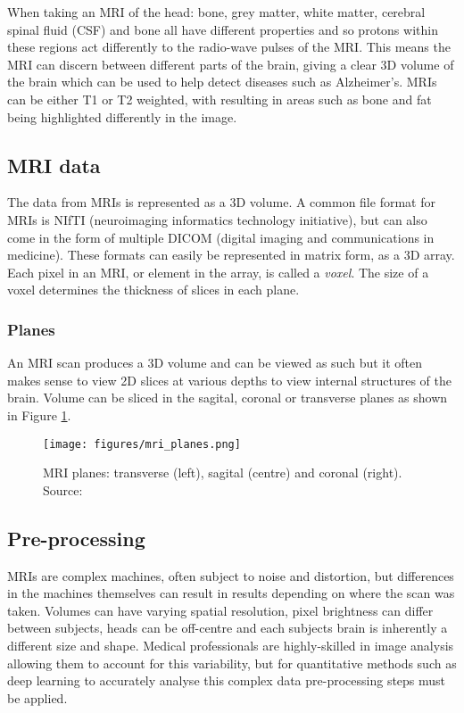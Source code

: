 \documentclass[
    author={Kai Hulme},
    supervisor={Dr Jon Bird},
    degree={BSc},
    title={Generative Adversarial Networks as an Augmentation Technique},
    subtitle={for Alzheimer's Disease Detection in MRI Volumes},
    type={Research},
    year={2021} 
]{dissertation}
\begin{document}
When taking an MRI of the head: bone, grey matter, white matter, cerebral spinal fluid (CSF) and bone all have different properties and so protons within these regions act differently to the radio-wave pulses of the MRI. This means the MRI can discern between different parts of the brain, giving a clear 3D volume of the brain which can be used to help detect diseases such as Alzheimer's. MRIs can be either T1 or T2 weighted, with resulting in areas such as bone and fat being highlighted differently in the image.

\subsection{MRI data}

The data from MRIs is represented as a 3D volume. A common file format for MRIs is NIfTI (neuroimaging informatics technology initiative), but can also come in the form of multiple DICOM (digital imaging and communications in medicine). These formats can easily be represented in matrix form, as a 3D array. Each pixel in an MRI, or element in the array, is called a \textit{voxel}. The size of a voxel determines the thickness of slices in each plane.

\subsubsection{Planes}

An MRI scan produces a 3D volume and can be viewed as such but it often makes sense to view 2D slices at various depths to view internal structures of the brain. Volume can be sliced in the sagital, coronal or transverse planes as shown in Figure \ref{mri_planes}.

\begin{figure}[t]
\centering
\texttt{[image: figures/mri\_planes.png]}
\caption{MRI planes: transverse (left), sagital (centre) and coronal (right). Source: \cite{ayers2019brain}
\label{mri_planes}}
\end{figure}

\subsection{Pre-processing}

MRIs are complex machines, often subject to noise and distortion, but differences in the machines themselves can result in results depending on where the scan was taken. Volumes can have varying spatial resolution, pixel brightness can differ between subjects, heads can be off-centre and each subjects brain is inherently a different size and shape. Medical professionals are highly-skilled in image analysis allowing them to account for this variability, but for quantitative methods such as deep learning to accurately analyse this complex data pre-processing steps must be applied.
\end{document}
